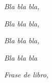 \thispagestyle{empty}

 
\vspace*{3cm}

\begin{flushright}
\textit{Bla bla bla,}
\end{flushright}
 

\begin{flushright}
\textit{Bla bla bla,}
\end{flushright}

\begin{flushright}
\textit{Bla bla bla,}
\end{flushright}
 

\begin{flushright}
\textit{Bla bla bla}
\end{flushright}
\clearemptydoublepage


\vspace*{3cm}

\begin{flushright}
\textit{Frase de libro,}
\end{flushright}
